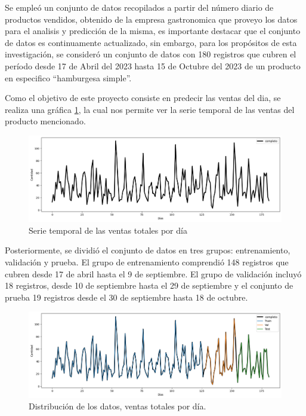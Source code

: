 
Se  empleó  un  conjunto  de  datos  recopilados  a  partir  del  número  diario  de  productos vendidos,  obtenido  de la empresa gastronomica que proveyo los datos para el analisis y predicción de la misma, es importante destacar que el conjunto de datos es continuamente actualizado, sin embargo, para los propósitos de esta investigación, se consideró un conjunto de datos con 180 registros que cubren el período desde 17 de Abril del 2023 hasta 15 de Octubre del 2023 de un producto en especifico “hamburgesa simple”.

Como el objetivo de este proyecto consiste en predecir las ventas del dia, se realiza una gráfica \ref{fig:serie_completa}, la cual nos permite ver la serie temporal de las ventas del producto mencionado. 

\begin{figure}[H]
  \begin{center}
    \includegraphics[scale=0.40]{./serie_normal_completa.png}
    \caption{Serie temporal de las ventas totales por día}
    \label{fig:serie_completa}
  \end{center}
\end{figure}

Posteriormente, se dividió el conjunto de datos en tres grupos: entrenamiento, validación y prueba. El grupo de entrenamiento comprendió 148 registros que cubren desde 17 de abril hasta el 9 de septiembre. El grupo de validación incluyó 18 registros, desde 10 de septiembre hasta el 29 de septiembre  y el conjunto de prueba 19 registros desde el 30 de septiembre hasta 18 de octubre.

\begin{figure}[H]
  \begin{center}
    \includegraphics[scale=0.40]{./serie_normal_dividida.png}
    \caption{Distribución de los datos, ventas totales por día.}
    \label{fig:distribucion_datos}
  \end{center}
\end{figure}

